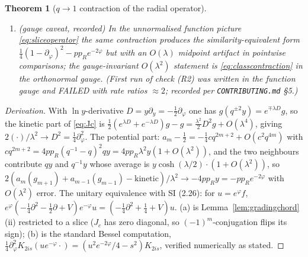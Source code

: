 \documentclass[11pt,a4paper]{article}
\theoremstyle{definition}
\theoremstyle{plain}
\newtheorem{theorem}[definition]{Theorem}
\begin{document}
\begin{theorem}[$q\to1$ contraction of the radial operator]
\begin{enumerate}[label=(\alph*)]
deviations on test functions have measured ratios $4.8,4.3$ ($pp_{R}>0$) and $4.3,4.2$
($pp_{R}<0$) per halving of $\lambda$ (checks (R2)).
\item \emph{(gauge caveat, recorded)} In the unnormalised function picture
\eqref{eq:sliceoperator} the same contraction produces the similarity-equivalent form
$\tfrac14(1-\partial_{\varphi})^{2}-pp_{R}e^{-2\varphi}$ but with an $O(\lambda)$ midpoint
artifact in pointwise comparisons; the gauge-invariant $O(\lambda^{2})$ statement is
\eqref{eq:classcontraction} in the orthonormal gauge. (First run of check (R2) was written in
the function gauge and FAILED with rate ratios $\approx2$; recorded per
\texttt{CONTRIBUTING.md} \S5.)
\end{enumerate}
\end{theorem}

\begin{proof}[Derivation]
With $\ln y$-derivative $D=y\partial_{y}=-\tfrac12\partial_{\varphi}$ one has
$g(q^{\pm2}y)=e^{\mp\lambda D}g$, so the kinetic part of \eqref{eq:Jc} is
$\tfrac12(e^{\lambda D}+e^{-\lambda D})g-g=\tfrac{\lambda^{2}}{2}D^{2}g+O(\lambda^{4})$,
giving $2(\cdot)/\lambda^{2}\to D^{2}=\tfrac14\partial_{\varphi}^{2}$. The potential part:
$a_{m}-\tfrac12=-\tfrac14 cq^{2m+2}+O(c^{2}q^{4m})$ with
$cq^{2m+2}=4pp_{R}(q^{-1}-q)^{2}qy=4pp_{R}\lambda^{2}y(1+O(\lambda^{2}))$, and the two
neighbours contribute $qy$ and $q^{-1}y$ whose average is $y\cosh(\lambda/2)\cdot(1+O(\lambda^2))$, so
$2(a_{m}(g_{m+1})+a_{m-1}(g_{m-1})-\text{kinetic})/\lambda^{2}\to-4pp_{R}y=-pp_{R}e^{-2\varphi}$
with $O(\lambda^{2})$ error. The unitary equivalence with SI (2.26): for $u=e^{\varphi}f$,
$e^{\varphi}(-\tfrac14\partial^{2}-\tfrac12\partial+V)e^{-\varphi}u
=(-\tfrac14\partial^{2}+\tfrac14+V)u$. (a) is Lemma~\ref{lem:gradingchord}(ii) restricted to
a slice ($J_{c}$ has zero diagonal, so $(-1)^{m}$-conjugation flips its sign); (b) is the
standard Bessel computation, $\tfrac14\partial_{\varphi}^{2}K_{2is}(ue^{-\varphi}\!\cdot)
=(u^{2}e^{-2\varphi}/4-s^{2})K_{2is}$, verified numerically as stated.
\end{proof}
\end{document}
